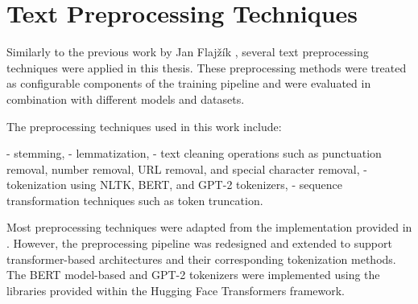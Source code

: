 \section{Text Preprocessing Techniques}

\begin{markdown}

Similarly to the previous work by Jan Flajžík \cite{flajzik_classification_2024}, several text preprocessing techniques were applied in this thesis. These preprocessing methods were treated as configurable components of the training pipeline and were evaluated in combination with different models and datasets.

The preprocessing techniques used in this work include:

- stemming,
- lemmatization,
- text cleaning operations such as punctuation removal, number removal, URL removal, and special character removal,
- tokenization using NLTK, BERT, and GPT-2 tokenizers,
- sequence transformation techniques such as token truncation.

Most preprocessing techniques were adapted from the implementation provided in \cite{flajzik_classification_2024}. However, the preprocessing pipeline was redesigned and extended to support transformer-based architectures and their corresponding tokenization methods. The BERT model-based and GPT-2 tokenizers were implemented using the libraries provided within the Hugging Face Transformers framework.

\end{markdown}